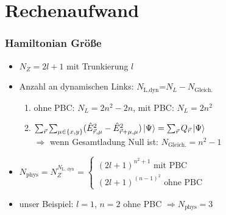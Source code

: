 \documentclass{beamer}
\begin{document}
\section{Rechenaufwand}
\begin{frame}
	\frametitle{Hamiltonian Größe}
	\begin{itemize}
		\item $N_Z=2l+1$ mit Trunkierung $l$
		\item Anzahl an dynamischen Links: $N_{\text{L,dyn}}$=$N_L-N_{\text{Gleich.}}$
		      \begin{enumerate}
			      \item ohne PBC: $N_L=2n^2-2n$, mit PBC: $N_L=2n^2$\vspace{4pt}
			      \item $\sum_{\vec{r}}\sum_{\mu\in\{x, y\}}(\hat{E}_{\vec{r}, \mu}^2-\hat{E}_{\vec{r}+\mu, \mu}^2)\ket{\Psi}=\sum_{\vec{r}}Q_{\vec{r}}\ket{\Psi}$\vspace{4pt}\\
			            $\Rightarrow$ wenn Gesamtladung Null ist: $N_{\text{Gleich.}}=n^2-1$\vspace{7pt}
		      \end{enumerate}
		\item $N_{\text{phys}}=N_Z^{N_{\text{L, dyn}}}=
			      \begin{cases}
				      (2l+1)^{n^2+1} \text{ mit PBC} \\
				      (2l+1)^{(n-1)^2} \text{ ohne PBC}
			      \end{cases}
		      $\vspace{7pt}
		\item unser Beispiel: $l=1$, $n=2$ ohne PBC $\Rightarrow N_\text{phys}=3$
	\end{itemize}
\end{frame}
\end{document}
